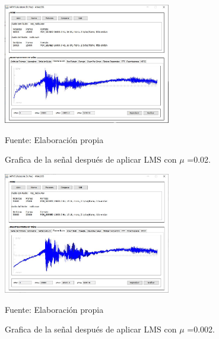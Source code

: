 \begin{figure}[H]
\begin{center}
\includegraphics[width=0.65\textwidth]{Imagenes/Cap3/image079}
\end{center}
\begin{center}
\vskip -0.5cm
\caption{\small{Grafica de la señal después de aplicar LMS con $\mu$ =0.02.}}
\label{fig:figura3.79}
{\small{Fuente: Elaboración propia}}
\end{center}
\end{figure}

\vskip -1cm

\begin{figure}[H]
\begin{center}
\includegraphics[width=0.65\textwidth]{Imagenes/Cap3/image080}
\end{center}
\begin{center}
\vskip -0.5cm
\caption{\small{Grafica de la señal después de aplicar LMS con $\mu$ =0.002.}}
\label{fig:figura3.80}
{\small{Fuente: Elaboración propia}}
\end{center}
\end{figure}

